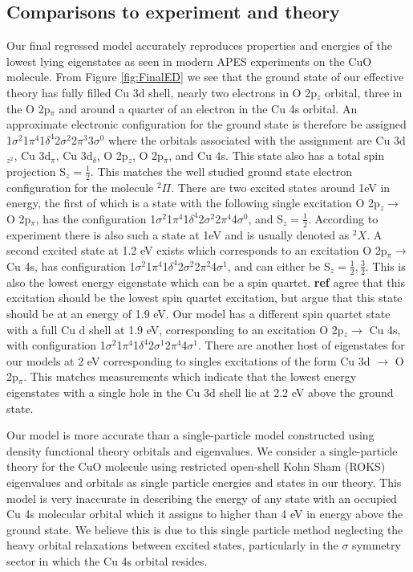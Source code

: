 \documentclass{article}
\begin{document}
\subsection{Comparisons to experiment and theory}
Our final regressed model accurately reproduces properties and energies of the lowest lying eigenstates as seen in modern APES experiments on the CuO molecule.
From Figure \ref{fig:FinalED} we see that the ground state of our effective theory has fully filled Cu 3d shell, nearly two electrons in O 2p$_z$ orbital, three in the O 2p$_\pi$ and around a quarter of an electron in the Cu 4s orbital.
An approximate electronic configuration for the ground state is therefore
be assigned 1$\sigma^2$1$\pi^4$1$\delta^4$2$\sigma^2$2$\pi^3$3$\sigma^0$ where the orbitals associated with the assignment are Cu 3d$_{z^2}$, Cu 3d$_\pi$, Cu 3d$_\delta$, O 2p$_z$, O 2p$_\pi$, and Cu 4s.
This state also has a total spin projection S$_z = \frac{1}{2}$.
This matches the well studied ground state electron configuration for the molecule $^2\Pi$.
There are two excited states around 1eV in energy, the first of which is a state with the following single excitation O 2p$_z \rightarrow$ O 2p$_\pi$, has the configuration 1$\sigma^2$1$\pi^4$1$\delta^4$2$\sigma^2$2$\pi^4$4$\sigma^0$, and S$_z = \frac{1}{2}$.
According to experiment there is also such a state at 1eV and is usually denoted as $^2X$.
A second excited state at 1.2 eV exists which corresponds to an excitation 
O 2p$_\pi \rightarrow$ Cu 4s, has configuration 1$\sigma^2$1$\pi^4$1$\delta^4$2$\sigma^2$2$\pi^2$4$\sigma^1$, and can either be S$_z = \frac{1}{2}, \frac{3}{2}$. 
This is also the lowest energy eigenstate which can be a spin quartet.
\textbf{ref} agree that this excitation should be the lowest spin quartet excitation, but argue that this state should be at an energy of 1.9 eV. 
Our model has a different spin quartet state with a full Cu d shell at 1.9 eV, corresponding to an excitation O 2p$_z \rightarrow$ Cu 4s, with configuration 1$\sigma^2$1$\pi^4$1$\delta^4$2$\sigma^1$2$\pi^4$4$\sigma^1$. 
There are another host of eigenstates for our models at 2 eV corresponding to singles excitations of the form Cu 3d $\rightarrow$ O 2p$_\pi$. 
This matches measurements which indicate that the lowest energy eigenstates with a single hole in the Cu 3d shell lie at 2.2 eV above the ground state.

Our model is more accurate than a single-particle model constructed using
density functional theory orbitals and eigenvalues. 
We consider a single-particle theory for the CuO molecule using restricted open-shell Kohn Sham (ROKS) eigenvalues and orbitals as single particle energies and states in our theory. 
This model is very inaccurate in describing the energy of any state with an occupied Cu 4s molecular orbital which it assigns to higher than 4 eV in energy above the ground state.
We believe this is due to this single particle method neglecting the heavy orbital relaxations between excited states, particularly in the $\sigma$ symmetry sector in which the Cu 4s orbital resides.
\end{document}

